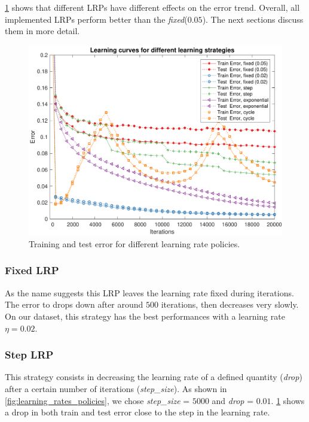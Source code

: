 \cref{fig:lrp_training_error} shows that different \acp{LRP} have different effects on the error trend.
Overall, all implemented \acp{LRP} perform better than the \textit{fixed}($0.05$).
The next sections discuss them in more detail.

\begin{figure}
	\centering
	\includegraphics[width=\columnwidth]{figures/error_strategies}
	\caption{Training and test error for different learning rate policies.}
	\label{fig:lrp_training_error}
\end{figure}

\subsubsection{Fixed \ac{LRP}}
As the name suggests this \ac{LRP} leaves the learning rate fixed during iterations.
The error to drops down after around $500$ iterations, then decreases very slowly. 
On our dataset, this strategy has the best performances with a learning rate $\eta = 0.02$.

\subsubsection{Step \ac{LRP}}
This strategy consists in decreasing the learning rate of a defined quantity (\textit{drop}) after a certain number of iterations (\textit{step\_size}).
As shown in \cref{fig:learning_rates_policies}, we chose \textit{step\_size} = $5000$ and \textit{drop} = $0.01$.
\cref{fig:lrp_training_error} shows a drop in both train and test error close to the step in the learning rate.

